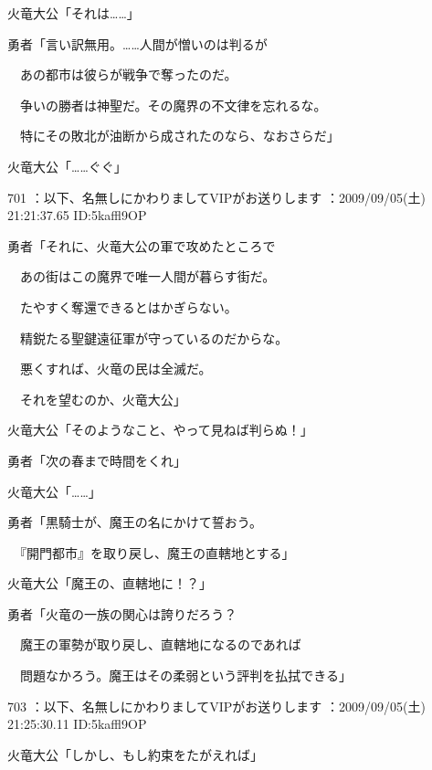 \documentclass[a4j,twocolumn]{tarticle}
\begin{document}
火竜大公「それは……」 



勇者「言い訳無用。……人間が憎いのは判るが\par{} 
　あの都市は彼らが戦争で奪ったのだ。\par{} 
　争いの勝者は神聖だ。その魔界の不文律を忘れるな。\par{} 
　特にその敗北が油断から成されたのなら、なおさらだ」 



火竜大公「……ぐぐ」 

	
    
    

701 ：以下、名無しにかわりましてVIPがお送りします ：2009/09/05(土) 21:21:37.65 ID:5kaffl9OP 


勇者「それに、火竜大公の軍で攻めたところで\par{} 
　あの街はこの魔界で唯一人間が暮らす街だ。\par{} 
　たやすく奪還できるとはかぎらない。\par{} 
　精鋭たる聖鍵遠征軍が守っているのだからな。\par{} 
　悪くすれば、火竜の民は全滅だ。\par{} 
　それを望むのか、火竜大公」 



火竜大公「そのようなこと、やって見ねば判らぬ！」 



勇者「次の春まで時間をくれ」\par{} 
火竜大公「……」 



勇者「黒騎士が、魔王の名にかけて誓おう。\par{} 
　『開門都市』を取り戻し、魔王の直轄地とする」 



火竜大公「魔王の、直轄地に！？」 



勇者「火竜の一族の関心は誇りだろう？ \par{}
　魔王の軍勢が取り戻し、直轄地になるのであれば\par{} 
　問題なかろう。魔王はその柔弱という評判を払拭できる」 

	
    
    

703 ：以下、名無しにかわりましてVIPがお送りします ：2009/09/05(土) 21:25:30.11 ID:5kaffl9OP 


火竜大公「しかし、もし約束をたがえれば」 
\end{document}

